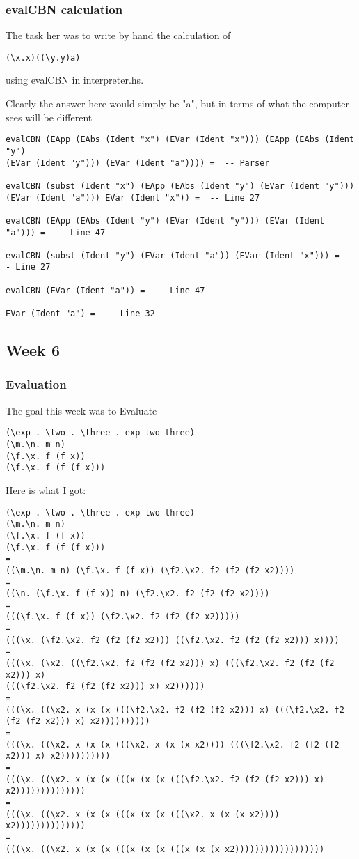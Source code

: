 \documentclass{article}
\theoremstyle{theorem}
\theoremstyle{definition}
\theoremstyle{remark}
\begin{document}
\subsubsection{evalCBN calculation}
The task her was to write by hand the calculation of 
\begin{verbatim}
(\x.x)((\y.y)a)
\end{verbatim}

using evalCBN in interpreter.hs.

Clearly the answer here would simply be "a", but in terms of what the computer sees will be different

\begin{verbatim}
evalCBN (EApp (EAbs (Ident "x") (EVar (Ident "x"))) (EApp (EAbs (Ident "y") 
(EVar (Ident "y"))) (EVar (Ident "a")))) =  -- Parser

evalCBN (subst (Ident "x") (EApp (EAbs (Ident "y") (EVar (Ident "y"))) 
(EVar (Ident "a"))) EVar (Ident "x")) =  -- Line 27

evalCBN (EApp (EAbs (Ident "y") (EVar (Ident "y"))) (EVar (Ident "a"))) =  -- Line 47

evalCBN (subst (Ident "y") (EVar (Ident "a")) (EVar (Ident "x"))) =  -- Line 27

evalCBN (EVar (Ident "a")) =  -- Line 47

EVar (Ident "a") =  -- Line 32
\end{verbatim}


\subsection{Week 6}
\subsubsection{Evaluation}
The goal this week was to Evaluate \begin{verbatim}
(\exp . \two . \three . exp two three)
(\m.\n. m n)
(\f.\x. f (f x))
(\f.\x. f (f (f x)))
\end{verbatim}

\noindent\newline\newline Here is what I got:

\begin{verbatim}
(\exp . \two . \three . exp two three)
(\m.\n. m n)
(\f.\x. f (f x))
(\f.\x. f (f (f x)))
=
((\m.\n. m n) (\f.\x. f (f x)) (\f2.\x2. f2 (f2 (f2 x2))))
=
((\n. (\f.\x. f (f x)) n) (\f2.\x2. f2 (f2 (f2 x2))))
=
(((\f.\x. f (f x)) (\f2.\x2. f2 (f2 (f2 x2)))))
=
(((\x. (\f2.\x2. f2 (f2 (f2 x2))) ((\f2.\x2. f2 (f2 (f2 x2))) x))))
=
(((\x. (\x2. ((\f2.\x2. f2 (f2 (f2 x2))) x) (((\f2.\x2. f2 (f2 (f2 x2))) x) 
(((\f2.\x2. f2 (f2 (f2 x2))) x) x2))))))
=
(((\x. ((\x2. x (x (x (((\f2.\x2. f2 (f2 (f2 x2))) x) (((\f2.\x2. f2 (f2 (f2 x2))) x) x2))))))))))
=
(((\x. ((\x2. x (x (x (((\x2. x (x (x x2)))) (((\f2.\x2. f2 (f2 (f2 x2))) x) x2))))))))))
=
(((\x. ((\x2. x (x (x (((x (x (x (((\f2.\x2. f2 (f2 (f2 x2))) x) x2))))))))))))))
=
(((\x. ((\x2. x (x (x (((x (x (x (((\x2. x (x (x x2)))) x2))))))))))))))
=
(((\x. ((\x2. x (x (x (((x (x (x (((x (x (x x2))))))))))))))))))
\end{verbatim}
\end{document}
